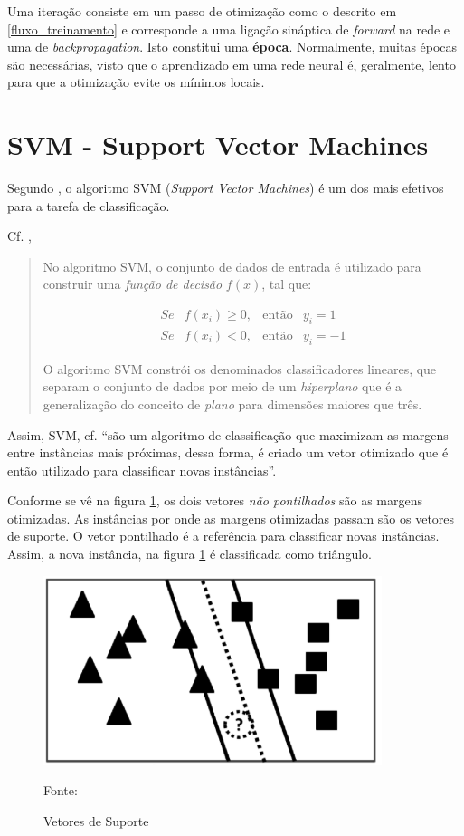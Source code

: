 Uma iteração consiste em um passo de otimização como o descrito em \ref{fluxo_treinamento} e corresponde a uma ligação sináptica de \textit{forward} na rede e uma de \textit{backpropagation}. Isto constitui uma \textbf{\underline{época}}. Normalmente, muitas épocas são necessárias, visto que o aprendizado em uma rede neural é, geralmente, lento para que a otimização evite os mínimos locais.

\section{SVM - Support Vector Machines}\label{SVM}
Segundo \cite{cortes_svm_1995}, o algoritmo SVM (\textit{Support Vector Machines}) é um dos mais efetivos para a tarefa de classificação.

Cf. \cite{goldschmidt2005},
\begin{quotation}
	No algoritmo SVM, o conjunto de dados de entrada é utilizado para construir uma \textit{função de decisão} $f(x)$, tal que:
	
		\begin{equation}
			\begin{matrix}
				Se & f(x_i) \ge 0, & \textrm{então} &  y_i = 1   \\
				Se & f(x_i) < 0,   & \textrm{então} &  y_i = -1   
			\end{matrix}
		\end{equation}

	O algoritmo SVM constrói os denominados classificadores lineares, que separam o conjunto de dados por meio de um \textit{hiperplano} que é a generalização do conceito de \textit{plano} para dimensões maiores que três.	
\end{quotation}

Assim, SVM, cf. \cite[p. 45]{aprenda_mineracao_fernando_amaral16} ``são um algoritmo de classificação que maximizam as margens entre instâncias mais próximas, dessa forma, é criado um vetor otimizado que é então utilizado para classificar novas instâncias''.

Conforme se vê na figura \ref{fig:svm}, os dois vetores \textit{não pontilhados} são as margens otimizadas. As instâncias por onde as margens otimizadas passam são os vetores de suporte. O vetor pontilhado é a referência para classificar novas instâncias. Assim, a nova instância, na figura \ref{fig:svm} é classificada como triângulo.

\begin{figure}[h!]
	\centering
	\includegraphics[width=.7\textwidth]{imagens/vetores_de_suporte.png}	
	\caption{Vetores de Suporte}
	\label{fig:svm}
	{\scriptsize 	Fonte: \cite[p. 45]{aprenda_mineracao_fernando_amaral16}}
\end{figure}


